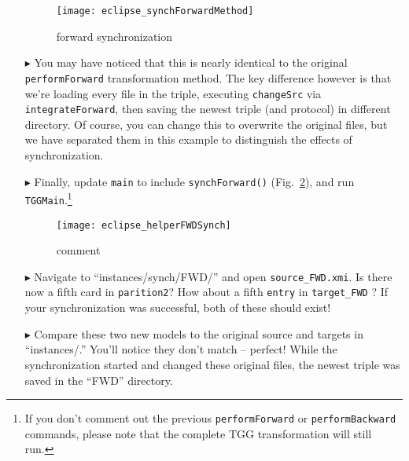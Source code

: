 \begin{itemize}
\vspace{0.5cm}

\begin{figure}[htbp]
\begin{center}
  \texttt{[image: eclipse\_synchForwardMethod]}
  \caption{forward synchronization}
  \label{eclipse:SynchForwardMethod}
\end{center}
\end{figure}

\newpage

\item[$\blacktriangleright$] You may have noticed that this is nearly identical to the original \texttt{performForward} transformation method. The key
difference however is that we're loading every file in the triple, executing \texttt{changeSrc} via \texttt{integrateForward}, then saving the newest triple
(and protocol) in different directory. Of course, you can change this to overwrite the original files, but we have separated them in this example to
distinguish the effects of synchronization.

\item[$\blacktriangleright$] Finally, update \texttt{main} to include \texttt{synchForward()} (Fig.~\ref{eclipse:helperFWD}), and run
\texttt{TGGMain}.\footnote{If you don't comment out the previous \texttt{performForward} or \texttt{performBackward} commands, please note that the complete
TGG transformation will still run.}

\begin{figure}[htbp]
\begin{center}
  \texttt{[image: eclipse\_helperFWDSynch]}
  \caption{comment}
  \label{eclipse:helperFWD}
\end{center}
\end{figure}

\item[$\blacktriangleright$] Navigate to ``instances/synch/FWD/'' and open \texttt{source\_FWD.xmi}. Is there now a fifth card in \texttt{parition2}? How about
a fifth \texttt{entry} in \texttt{target\_FWD} ? If your synchronization was successful, both of these should exist!

\item[$\blacktriangleright$] Compare these two new models to the original source and targets in ``instances/.'' You'll notice they don't match -- perfect! While
the synchronization started and changed these original files, the newest triple was saved in the ``FWD'' directory.


\end{itemize}
